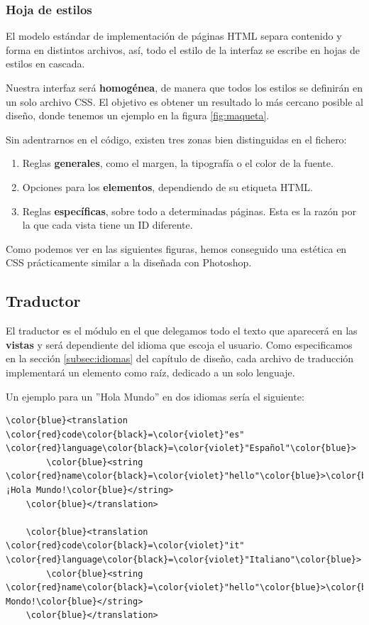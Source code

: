 \subsubsection{Hoja de estilos}

El modelo estándar de implementación de páginas \acrshort{HTML} separa contenido y forma en distintos archivos, así, todo el estilo de la interfaz se escribe en hojas de estilos en cascada.

Nuestra interfaz será \textbf{homogénea}, de manera que todos los estilos se definirán en un solo archivo \acrshort{CSS}. El objetivo es obtener un resultado lo más cercano posible al diseño, donde tenemos un ejemplo en la figura \ref{fig:maqueta}.

Sin adentrarnos en el código, existen tres zonas bien distinguidas en el fichero:

\begin{enumerate}
	\item Reglas \textbf{generales}, como el margen, la tipografía o el color de la fuente.
	\item Opciones para los \textbf{elementos}, dependiendo de su etiqueta \acrshort{HTML}.
	\item Reglas \textbf{específicas}, sobre todo a determinadas páginas. Esta es la razón por la que cada vista tiene un ID diferente.
\end{enumerate}

Como podemos ver en las siguientes figuras, hemos conseguido una estética en \acrshort{CSS} prácticamente similar a la diseñada con Photoshop.

\subsection{Traductor}

El traductor es el módulo en el que delegamos todo el texto que aparecerá en las \textbf{vistas} y será dependiente del idioma que escoja el usuario. Como especificamos en la sección \ref{subsec:idiomas} del capítulo de diseño, cada archivo de traducción implementará un elemento  como raíz, dedicado a un solo lenguaje.

Un ejemplo para un ''Hola Mundo'' en dos idiomas sería el siguiente:

\begin{Verbatim}[commandchars=\\\{\}]
	\color{blue}<translation \color{red}code\color{black}=\color{violet}"es" \color{red}language\color{black}=\color{violet}"Español"\color{blue}>
	    \color{blue}<string \color{red}name\color{black}=\color{violet}"hello"\color{blue}>\color{black}¡Hola Mundo!\color{blue}</string>
	\color{blue}</translation>

	\color{blue}<translation \color{red}code\color{black}=\color{violet}"it" \color{red}language\color{black}=\color{violet}"Italiano"\color{blue}>
		\color{blue}<string \color{red}name\color{black}=\color{violet}"hello"\color{blue}>\color{black}Ciao Mondo!\color{blue}</string>
	\color{blue}</translation>
\end{Verbatim}

